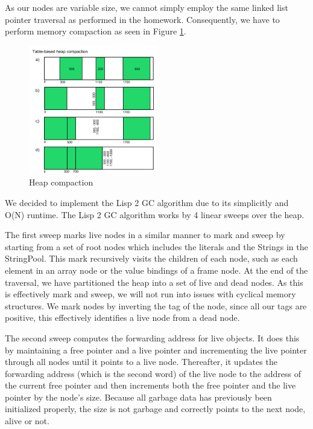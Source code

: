 \documentclass{report}
\begin{document}
As our nodes are variable size, we cannot simply employ the same linked list pointer traversal as performed in the homework. Consequently, we have to perform memory compaction as seen in Figure \ref{fig:heap-compaction}.

\begin{figure}
    \centering
    \includegraphics[width=0.5\textwidth]{table-compaction.png}
    \caption{Heap compaction}
    \label{fig:heap-compaction}
\end{figure}

We decided to implement the Lisp 2 GC algorithm due to its simplicitly and O(N) runtime. The Lisp 2 GC algorithm works by 4 linear sweeps over the heap. 

The first sweep marks live nodes in a similar manner to mark and sweep by starting from a set of root nodes which includes the literals and the Strings in the StringPool. This mark recursively visits the children of each node, such as each element in an array node or the value bindings of a frame node. At the end of the traversal, we have partitioned the heap into a set of live and dead nodes. As this is effectively mark and sweep, we will not run into issues with cyclical memory structures. We mark nodes by inverting the tag of the node, since all our tags are positive, this effectively identifies a live node from a dead node.

The second sweep computes the forwarding address for live objects. It does this by maintaining a free pointer and a live pointer and incrementing the live pointer through all nodes until it points to a live node. Thereafter, it updates the forwarding address (which is the second word) of the live node to the address of the current free pointer and then increments both the free pointer and the live pointer by the node's size. Because all garbage data has previously been initialized properly, the size is not garbage and correctly points to the next node, alive or not. 
\end{document}
